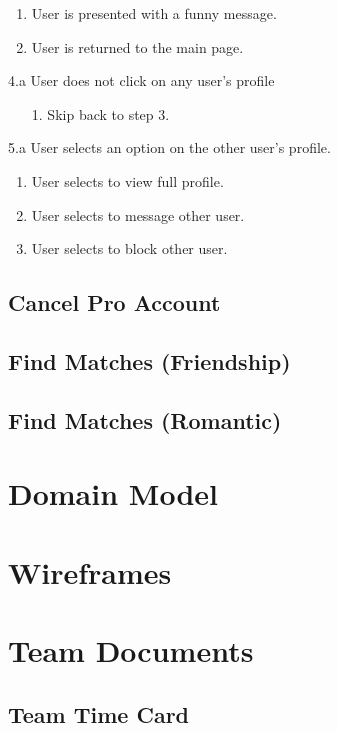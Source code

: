 \documentclass[10pt, draft]{article}
\begin{document}
\begin{usecase}
{\begin{enumerate}
			\begin{enumerate}
				\item User is presented with a funny message.
				\item User is returned to the main page.
			\end{enumerate}
		\end{enumerate}
		\item[4.a] User does not click on any user's profile
		\begin{enumerate}
			\item[1.] Skip back to step 3.
		\end{enumerate}
		\item[5.a] User selects an option on the other user's profile.
		\begin{enumerate}
			\item User selects to view full profile.
			\item User selects to message other user.
			\item User selects to block other user.
		\end{enumerate}
	}
\end{usecase}
\subsection{Cancel Pro Account}
\subsection{Find Matches (Friendship)}
\subsection{Find Matches (Romantic)}

\section{Domain Model}

\section{Wireframes}

\section{Team Documents}
\subsection{Team Time Card}
\end{document}
